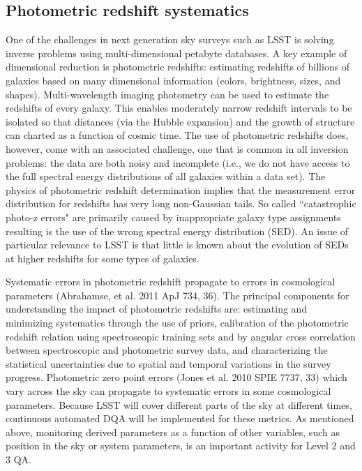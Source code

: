 \documentclass[SE,toc]{lsstdoc}
\begin{document}
\subsection{Photometric redshift systematics}

One of the challenges in next generation sky surveys such as LSST is solving inverse problems using multi-dimensional petabyte databases. A key example of dimensional reduction is photometric redshifts: estimating redshifts of billions of galaxies based on many dimensional information (colors, brightness, sizes, and shapes). Multi-wavelength imaging photometry can be used to estimate the redshifts of every galaxy.  This enables moderately narrow redshift intervals to be isolated so that distances (via the Hubble expansion) and the growth of structure can charted as a function of cosmic time.  The use of photometric redshifts does, however, come with an associated challenge, one that is common in all inversion problems: the data are both noisy and incomplete (i.e., we do not have access to the full spectral energy distributions of all galaxies within a data set). The physics of photometric redshift determination implies that the measurement error distribution for redshifts has very long non-Gaussian tails. So called ``catastrophic photo-z errors" are primarily caused by inappropriate galaxy type assignments resulting is the use of the wrong spectral energy distribution (SED). An issue of particular relevance to LSST is that little is known about the evolution of SEDs at higher redshifts for some types of galaxies.

Systematic errors in photometric redshift propagate to errors in cosmological parameters (Abrahamse, et al. 2011 ApJ 734, 36). The principal components for understanding the impact of photometric redshifts are: estimating and minimizing systematics through the use of priors, calibration of the photometric redshift relation using spectroscopic training sets and by angular cross correlation between spectroscopic and photometric survey data, and characterizing the statistical uncertainties due to spatial and temporal variations in the survey progress.  Photometric zero point errors (Jones et al. 2010 SPIE 7737, 33) which vary across the sky can propagate to systematic errors in some cosmological parameters. Because LSST will cover different parts of the sky at different times, continuous automated DQA will be implemented for these metrics. As mentioned above, monitoring derived parameters as a function of other variables, such as position in the sky or system parameters, is an important activity for Level 2 and 3 QA.
\end{document}
